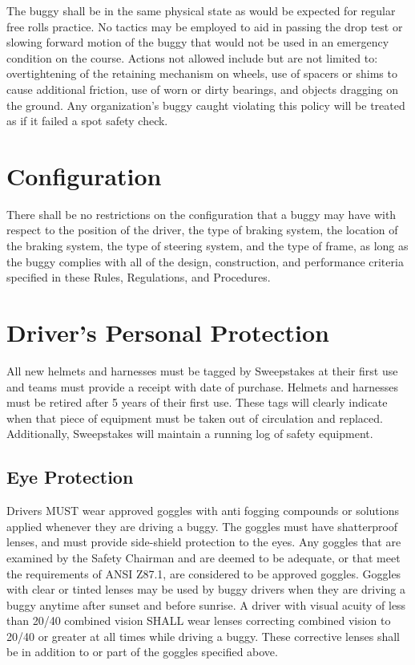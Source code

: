 The buggy shall be in the same physical state as would be expected for regular free rolls practice. No tactics may be employed to aid in passing the drop test or slowing forward motion of the buggy that would not be used in an emergency condition on the course. Actions not allowed include but are not limited to: overtightening of the retaining mechanism on wheels, use of spacers or shims to cause additional friction, use of worn or dirty bearings, and objects dragging on the ground. Any organization's buggy caught violating this policy will be treated as if it failed a spot safety check.


\section{Configuration}

	There shall be no restrictions on the configuration that a buggy may have with respect to the position of the driver, the type of braking system, the location of the braking system, the type of steering system, and the type of frame, as long as the buggy complies with all of the design, construction, and performance criteria specified in these Rules, Regulations, and Procedures.

\section{Driver's Personal Protection}

	All new helmets and harnesses must be tagged by Sweepstakes at their first use and teams must provide a receipt with date of purchase. Helmets and harnesses must be retired after 5 years of their first use. These tags will clearly indicate when that piece of equipment must be taken out of circulation and replaced. Additionally, Sweepstakes will maintain a running log of safety equipment. 

\subsection{Eye Protection}

	Drivers MUST wear approved goggles with anti fogging compounds or solutions applied whenever they are driving a buggy. The goggles must have shatterproof lenses, and must provide side-shield protection to the eyes. Any goggles that are examined by the Safety Chairman and are deemed to be adequate, or that meet the requirements of ANSI Z87.1, are considered to be approved goggles. Goggles with clear or tinted lenses may be used by buggy drivers when they are driving a buggy anytime after sunset and before sunrise. A driver with visual acuity of less than 20/40 combined vision SHALL wear lenses correcting combined vision to 20/40 or greater at all times while driving a buggy. These corrective lenses shall be in addition to or part of the goggles specified above.

